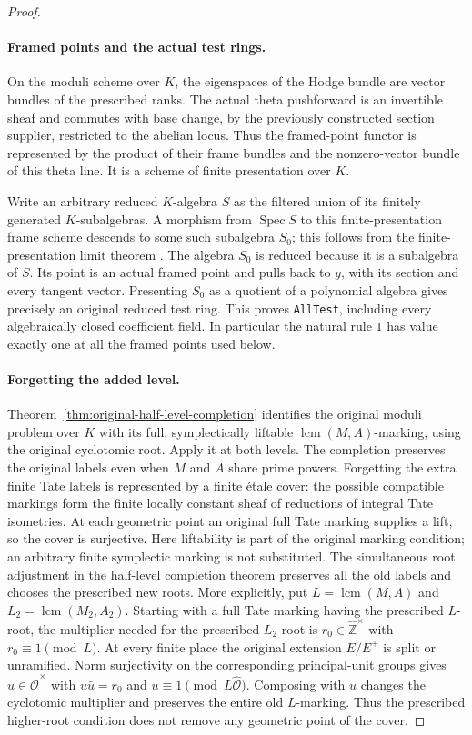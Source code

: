 \begin{proof}
\paragraph{Framed points and the actual test rings.}
On the moduli scheme over $K$, the eigenspaces of the Hodge bundle
are vector bundles of the prescribed ranks.  The actual theta
pushforward is an invertible sheaf and commutes with base change,
by the previously constructed section supplier, restricted to the
abelian locus.  Thus the framed-point functor is represented by the
product of their frame bundles and the nonzero-vector bundle of
this theta line.  It is a scheme of finite presentation over $K$.

Write an arbitrary reduced $K$-algebra $S$ as the filtered union of
its finitely generated $K$-subalgebras.  A morphism from
$\operatorname{Spec}S$ to this finite-presentation frame scheme
descends to some such subalgebra $S_0$; this follows from the
finite-presentation limit theorem \cite{level-cover-limits}.
The algebra $S_0$ is reduced because it is a subalgebra of $S$.
Its point is an actual framed point and pulls back to $y$, with
its section and every tangent vector.  Presenting $S_0$ as a quotient
of a polynomial algebra gives precisely an original reduced test
ring.  This proves \texttt{AllTest}, including every algebraically
closed coefficient field.  In particular the natural rule $1$ has
value exactly one at all the framed points used below.

\paragraph{Forgetting the added level.}
Theorem~\ref{thm:original-half-level-completion} identifies the
original moduli problem over $K$ with its full, symplectically
liftable $\operatorname{lcm}(M,A)$-marking, using the original
cyclotomic root.  Apply it at both levels.  The completion preserves
the original labels even when $M$ and $A$ share prime powers.
Forgetting the extra finite Tate labels is represented by a finite
\'etale cover: the possible compatible markings form the finite
locally constant sheaf of reductions of integral Tate isometries.
At each geometric point an original full Tate marking supplies a
lift, so the cover is surjective.  Here liftability is part of the
original marking condition; an arbitrary finite symplectic marking
is not substituted.  The simultaneous root adjustment in the
half-level completion theorem preserves all the old labels and
chooses the prescribed new roots.  More explicitly, put
$L=\operatorname{lcm}(M,A)$ and $L_2=\operatorname{lcm}(M_2,A_2)$.
Starting with a full Tate marking having the prescribed $L$-root,
the multiplier needed for the prescribed $L_2$-root is
$r_0\in\widehat{\mathbb Z}^{\times}$ with $r_0\equiv1\pmod L$.
At every finite place the original extension $E/E^+$ is split or
unramified.  Norm surjectivity on the corresponding principal-unit
groups gives $u\in\widehat{\mathcal O}^{\times}$ with
$u\bar u=r_0$ and $u\equiv1\pmod{L\widehat{\mathcal O}}$.
Composing with $u$ changes the cyclotomic multiplier and preserves
the entire old $L$-marking.  Thus the prescribed higher-root
condition does not remove any geometric point of the cover.


\end{proof}
